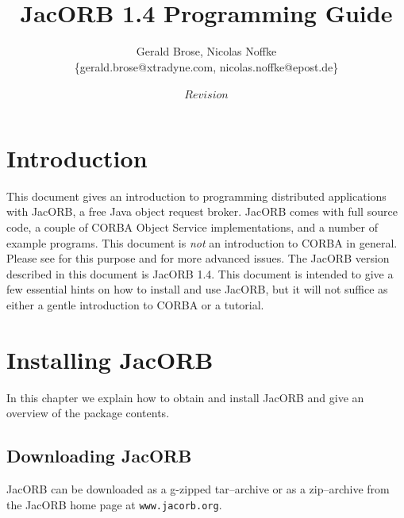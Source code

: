 \documentclass[12pt]{scrbook}
\title{JacORB 1.4 Programming Guide}
\author{Gerald Brose, Nicolas Noffke\\
\{gerald.brose@xtradyne.com, nicolas.noffke@epost.de\}\\
\\
$Revision$
}
\begin{document}
\newcommand{\cmdline}[1]{\begin{small}\noindent \texttt{\$ #1}\end{small}}

\newcommand{\JacORBDir}{JacORB1\_4}
\newcommand{\JacORBVersion}{1.4}

\maketitle


\setlength{\parskip}{1.1ex}
\newpage
\tableofcontents

\chapter{Introduction}

This  document  gives   an  introduction  to  programming  distributed
applications with  JacORB, a free  Java object request  broker. JacORB
comes  with  full  source  code,  a couple  of  CORBA  Object  Service
implementations, and  a number of example programs.   This document is
{\it  not}   an  introduction  to   CORBA  in  general.    Please  see
\cite{Brose2001a,Siegel2000,   Vinoski1997}  for   this   purpose  and
\cite{Henning1999}  for  more  advanced  issues.  The  JacORB  version
described in this document  is JacORB \JacORBVersion. This document is
intended  to give  a few  essential hints  on how  to install  and use
JacORB, but  it will  not suffice as  either a gentle  introduction to
CORBA or a tutorial.


\chapter{Installing JacORB}
\label{Ch_installing}

In this chapter  we explain how to obtain and  install JacORB and give
an overview of the package contents.

\section{Downloading JacORB}


JacORB can be downloaded as a g-zipped tar--archive or as a zip--archive
from the  JacORB home page  at {\tt www.jacorb.org}.
\end{document}
